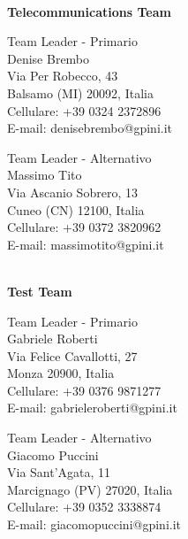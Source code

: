 \documentclass[12pt, a4paper, titlepage]{report}
\begin{document}
	\vspace{0.5cm}
	\centerline{\textbf{\\Telecommunications Team}}
	\begin{paracol}{2}
		\setlength{\columnsep}{5em}
		\begin{leftcolumn}
			\begin{adjustwidth}{0.5cm}{}
				Team Leader - Primario \\
				Denise Brembo \\
				Via Per Robecco, 43\\ 
				Balsamo (MI) 20092, Italia \\ 
				Cellulare:  +39 0324 2372896 \\
				E-mail:  denisebrembo@gpini.it 
			\end{adjustwidth}
		\end{leftcolumn}
		\begin{rightcolumn}
			\begin{adjustwidth}{0.5cm}{}
				Team Leader - Alternativo \\
				Massimo Tito\\
				Via Ascanio Sobrero, 13\\ 
				Cuneo (CN) 12100, Italia \\
				Cellulare:  +39 0372 3820962 \\
				E-mail: massimotito@gpini.it 
			\end{adjustwidth}
		\end{rightcolumn}
	\end{paracol}
	
	\vspace{0.5cm}
	\centerline{\textbf{\\Test Team}}
	\begin{paracol}{2}
		\setlength{\columnsep}{5em}
		\begin{leftcolumn}
			\begin{adjustwidth}{0.5cm}{}
				Team Leader - Primario \\
				Gabriele Roberti\\
				Via Felice Cavallotti, 27\\ 
				Monza 20900, Italia \\
				Cellulare:  +39 0376 9871277 \\
				E-mail:  gabrieleroberti@gpini.it 
			\end{adjustwidth}
		\end{leftcolumn}
		\begin{rightcolumn}
			\begin{adjustwidth}{0.5cm}{}
				Team Leader - Alternativo \\
				Giacomo Puccini\\
				Via Sant'Agata, 11\\ 
				Marcignago (PV) 27020, Italia \\
				Cellulare:  +39 0352 3338874 \\
				E-mail: giacomopuccini@gpini.it 
			\end{adjustwidth}
		\end{rightcolumn}
	\end{paracol}
	
\end{document}
